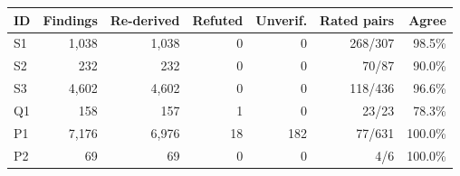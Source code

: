 \begin{tabular}{@{}lrrrrrr@{}}
\toprule
ID & Findings & Re-derived & Refuted & Unverif. & Rated pairs & Agree \\
\midrule
S1 & 1,038 & 1,038 & 0 & 0 & 268/307 & 98.5\% \\
S2 & 232 & 232 & 0 & 0 & 70/87 & 90.0\% \\
S3 & 4,602 & 4,602 & 0 & 0 & 118/436 & 96.6\% \\
Q1 & 158 & 157 & 1 & 0 & 23/23 & 78.3\% \\
P1 & 7,176 & 6,976 & 18 & 182 & 77/631 & 100.0\% \\
P2 & 69 & 69 & 0 & 0 & 4/6 & 100.0\% \\
\bottomrule
\end{tabular}
